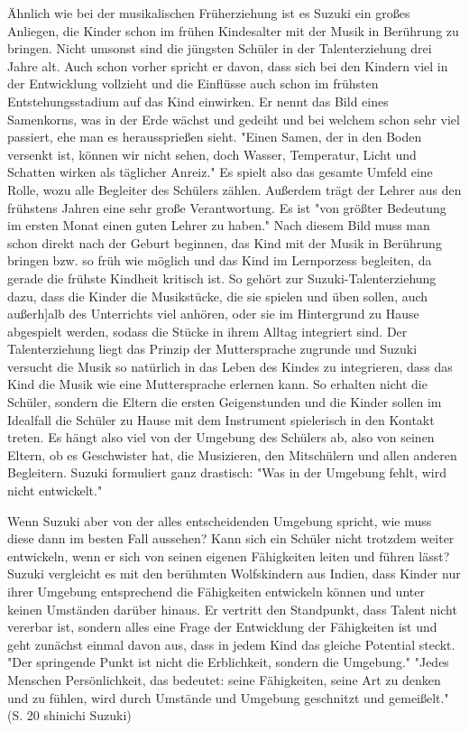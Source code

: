 Ähnlich wie bei der musikalischen Früherziehung ist es Suzuki ein großes Anliegen,
die Kinder schon im frühen Kindesalter mit der Musik in Berührung zu bringen.
Nicht umsonst sind die jüngsten Schüler in der Talenterziehung drei Jahre alt. Auch schon vorher
spricht er davon, dass sich bei den Kindern viel in der Entwicklung vollzieht
und die Einflüsse auch schon im frühsten Entstehungsstadium auf das Kind
einwirken. Er nennt das Bild eines Samenkorns, was in der Erde wächst und
gedeiht und bei welchem schon sehr viel passiert, ehe man es heraussprießen sieht. "Einen Samen, der
in den Boden versenkt ist, können wir nicht sehen, doch Wasser, Temperatur,
Licht und Schatten wirken als täglicher Anreiz."\autocite[17]{suzuki:erziehung_ist_liebe}
Es spielt also das gesamte Umfeld eine Rolle, wozu alle Begleiter des Schülers
zählen. Außerdem trägt der Lehrer aus den frühstens Jahren eine sehr
große Verantwortung. Es ist "von größter Bedeutung im ersten Monat einen guten Lehrer zu
haben." \autocite[21]{suzuki:erziehung_ist_liebe}
 Nach diesem Bild muss man schon direkt nach der Geburt beginnen, das Kind mit
der Musik in Berührung bringen bzw. so früh wie
möglich und das Kind im Lernporzess begleiten, da gerade die frühste Kindheit
kritisch ist. \autocite[25]{suzuki:erziehung_ist_liebe}
So gehört zur Suzuki-Talenterziehung dazu, dass die Kinder die Musikstücke,
die sie spielen und üben sollen, auch außerh]alb des Unterrichts viel anhören, oder sie im Hintergrund zu Hause
abgespielt werden, sodass die Stücke in ihrem Alltag integriert sind.
Der Talenterziehung liegt das Prinzip der Muttersprache zugrunde und Suzuki versucht
die Musik so natürlich in das Leben des Kindes zu integrieren, dass das Kind die
Musik wie eine Muttersprache erlernen kann.  So erhalten nicht die Schüler,
sondern die Eltern die ersten
Geigenstunden und die Kinder sollen im Idealfall die Schüler zu Hause mit dem
Instrument spielerisch in den Kontakt treten. \autocite[75]{suzuki:erziehung_ist_liebe}
Es hängt also viel von der Umgebung des Schülers ab, also von seinen Eltern, ob
es Geschwister hat, die Musizieren, den Mitschülern und allen anderen Begleitern.
Suzuki formuliert ganz drastisch: "Was in der Umgebung fehlt, wird nicht entwickelt." \autocite[25]{suzuki:erziehung_ist_liebe}

Wenn Suzuki aber von der alles entscheidenden Umgebung spricht, wie muss diese
dann im besten Fall aussehen? Kann sich ein Schüler nicht trotzdem weiter
entwickeln, wenn er sich von seinen eigenen Fähigkeiten leiten und führen lässt?
Suzuki vergleicht es mit den berühmten Wolfskindern aus Indien, dass Kinder nur
ihrer Umgebung entsprechend die Fähigkeiten entwickeln können und unter keinen
Umständen darüber hinaus. \autocite[24]{suzuki:erziehung_ist_liebe}
Er vertritt den Standpunkt, dass Talent nicht vererbar ist, sondern alles eine Frage
der Entwicklung der Fähigkeiten ist und geht zunächst einmal davon aus, dass
in jedem Kind das gleiche Potential steckt. "Der springende Punkt ist nicht die
Erblichkeit, sondern die Umgebung." \autocite[24]{suzuki:erziehung_ist_liebe}
"Jedes Menschen Persönlichkeit, das bedeutet: seine Fähigkeiten, seine Art zu
denken und zu fühlen, wird durch Umstände und Umgebung geschnitzt und
gemeißelt." (S. 20 shinichi Suzuki)

